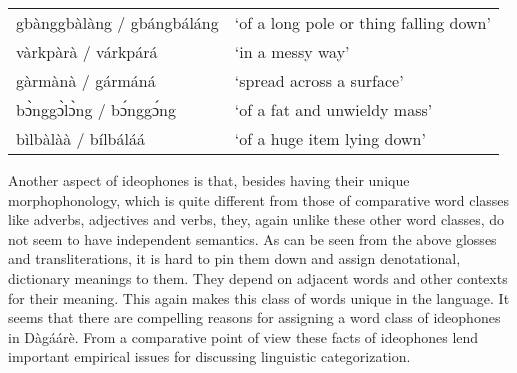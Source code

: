 \begin{refsection}
\ea \label{ex:ideophones} {\begin{tabular}{ll}  
gbànggbàlàng / gbángbáláng  & ‘of a long pole or thing falling down’\\
vàrkpàrà / várkpárá& ‘in a messy way’\\
gàrmànà / gármáná & ‘spread across a surface’\\
bɔ̀nggɔ̀lɔ̀ng / bɔ́nggɔ́ng& ‘of a fat and unwieldy mass’\\
bìlbàlàà / bílbáláá& ‘of a huge item lying down’\\
\end{tabular}}\z


\ea\label{ex:ideophonesexx} 
\z\z

Another aspect of ideophones is that, besides having their unique morphophonology, which is
quite different from those of comparative word classes like adverbs, adjectives and verbs, they, again unlike these other word classes, do not seem to have independent semantics.
As can be seen from the above glosses and transliterations, it is hard to pin them down and
assign denotational, dictionary meanings to them. They depend on adjacent words and other
contexts for their meaning. This again makes this class of words unique in the language. It
seems that there are compelling reasons for assigning a word class of ideophones in
Dàgáárè. From a comparative point of view these facts of ideophones lend important
empirical issues for discussing linguistic categorization.


\end{refsection}
